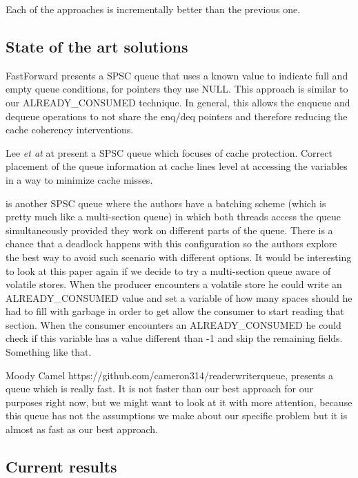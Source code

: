 Each of the approaches is incrementally better than the previous one.  


\subsection{State of the art solutions}
\label{subsec:stateArtQueues}

FastForward \cite{giacomoni2008fastforward} presents a SPSC queue that uses a known value to indicate full and empty queue conditions, for pointers they use NULL. This approach is similar to our ALREADY\_CONSUMED technique. In general, this allows the enqueue and dequeue operations to not share the enq/deq pointers and therefore reducing the cache coherency interventions. 

Lee \textit{et at} at \cite{lee2010lock} present a SPSC queue which focuses of cache protection. Correct placement of the queue information at cache lines level at accessing the variables in a way to minimize cache misses. 

\cite{wang2013bQueue} is another SPSC queue where the authors have a batching scheme (which is pretty much like a multi-section queue) in which both threads access the queue simultaneously provided they work on different parts of the queue. There is a chance that a deadlock happens with this configuration so the authors explore the best way to avoid such scenario with different options. It would be interesting to look at this paper again if we decide to try a multi-section queue aware of volatile stores. When the producer encounters a volatile store he could write an ALREADY\_CONSUMED value and set a variable of how many spaces should he had to fill with garbage in order to get allow the consumer to start reading that section. When the consumer encounters an ALREADY\_CONSUMED he could check if this variable has a value different than -1 and skip the remaining fields. Something like that. 

Moody Camel https://github.com/cameron314/readerwriterqueue, presents a queue which is really fast. It is not faster than our best approach for our purposes right now, but we might want to look at it with more attention, because this queue has not the assumptions we make about our specific problem but it is almost as fast as our best approach. 

\subsection{Current results}
\label{subsec:currentResults}

